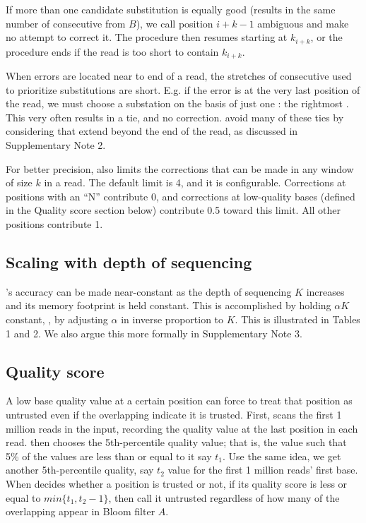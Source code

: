 \documentclass{bmcart}
\begin{document}
If more than one candidate substitution is equally good (\thatis results in the same number of consecutive \kmers from $B$), we call position $i+k-1$ ambiguous and make no attempt to correct it.
The procedure then resumes starting at $k_{i+k}$, or the procedure ends if the read is too short to contain \kmer $k_{i+k}$.

When errors are located near to end of a read, the stretches of consecutive \kmers used to prioritize substitutions are short.  E.g. if the error is at the very last position of the read, we must choose a substation on the basis of just one \kmer: the rightmost \kmer.  This very often results in a tie, and no correction.  \tool avoid many of these ties by considering \kmers that extend beyond the end of the read, as discussed in Supplementary Note 2.

For better precision, \tool also limits the corrections that can be made in any window of size $k$ in a read.
The default limit is 4, and it is configurable.
Corrections at positions with an ``N'' contribute 0, and corrections at low-quality bases (defined in the Quality score section below) contribute 0.5 toward this limit.
All other positions contribute 1.

\subsection*{Scaling with depth of sequencing}
\tool's accuracy can be made near-constant as the depth of sequencing $K$ increases and its memory footprint is held constant.  This is accomplished by holding $\alpha K$ constant, \thatis, by adjusting $\alpha$ in inverse proportion to $K$.  This is illustrated in Tables 1 and 2.  We also argue this more formally in Supplementary Note 3.

\subsection*{Quality score}
A low base quality value at a certain position can force \tool to treat that position as untrusted even if the overlapping \kmers indicate it is trusted.  First, \tool scans the first 1 million reads in the input, recording the quality value at the last position in each read.  \tool then chooses the 5th-percentile quality value; that is, the value such that 5\% of the values are less than or equal to it say $t_1$. Use the same idea, we get another 5th-percentile quality, say $t_2$ value for the first 1 million reads' first base. When \tool decides whether a position is trusted or not, if its quality score is less or equal to $min\{t_1, t_2 - 1\}$, then call it untrusted regardless of how many of the overlapping \kmers appear in Bloom filter $A$. 
\end{document}

